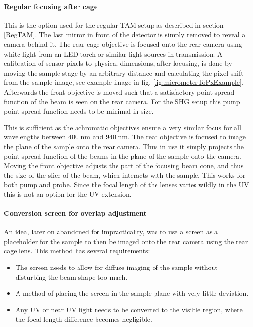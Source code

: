 \documentclass[twoside,openright,listof=numbered]{scrreprt}
\begin{document}
\paragraph{Regular focusing after cage}\label{regRearFocus}
This is the option used for the regular TAM setup as described in section \ref{RegTAM}. The last mirror in front of the detector is simply removed to reveal a camera behind it. The rear cage objective is focused onto the rear camera using white light from an LED torch or similar light sources in transmission. A calibration of sensor pixels to physical dimensions, after focusing, is done by moving the sample stage by an arbitrary distance and calculating the pixel shift from the sample image, see example image in fig. \ref{fig:micrometerToPxExample}. Afterwards the front objective is moved such that a satisfactory point spread function of the beam is seen on the rear camera. For the SHG setup this pump point spread function needs to be minimal in size.

This is sufficient as the achromatic objectives ensure a very similar focus for all wavelengths between 400 nm and 940 nm. The rear objective is focused to image the plane of the sample onto the rear camera. Thus in use it simply projects the point spread function of the beams in the plane of the sample onto the camera. Moving the front objective adjusts the part of the focusing beam cone, and thus the size of the slice of the beam, which interacts with the sample. This works for both pump and probe. Since the focal length of the lenses varies wildly in the UV this is not an option for the UV extension.
\paragraph{Conversion screen for overlap adjustment}
An idea, later on abandoned for impracticality, was to use a screen as a placeholder for the sample to then be imaged onto the rear camera using the rear cage lens. This method has several requirements:
\begin{itemize}
\item The screen needs to allow for diffuse imaging of the sample without disturbing the beam shape too much.
\item A method of placing the screen in the sample plane with very little deviation.
\item Any UV or near UV light needs to be converted to the visible region, where the focal length difference becomes negligible.
\end{itemize}
\end{document}
